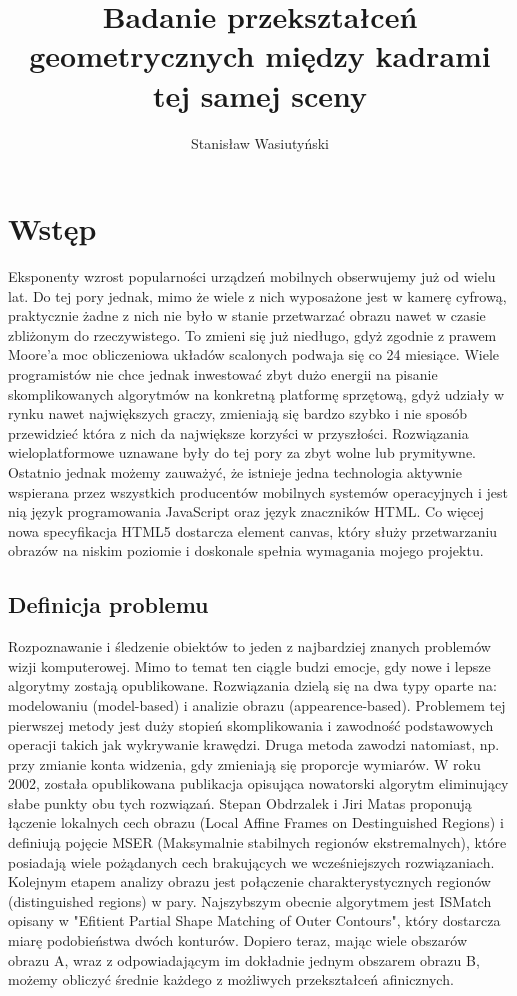 \documentclass[a4paper,12pt,polski]{report}
\title{Badanie przekształceń geometrycznych między kadrami tej samej sceny}
\author{Stanisław Wasiutyński}
\begin{document}
\maketitle

\tableofcontents

\newpage


\chapter{Wstęp}

Eksponenty wzrost popularności urządzeń mobilnych obserwujemy już od wielu lat.
Do tej pory jednak, mimo że wiele z nich wyposażone jest w kamerę cyfrową,
praktycznie żadne z nich nie było w stanie przetwarzać obrazu nawet w czasie
zbliżonym do rzeczywistego. To zmieni się już niedługo, gdyż zgodnie z prawem
Moore'a moc obliczeniowa układów scalonych podwaja się co 24 miesiące.  Wiele
programistów nie chce jednak inwestować zbyt dużo energii na pisanie
skomplikowanych algorytmów na konkretną platformę sprzętową, gdyż udziały w
rynku nawet największych graczy, zmieniają się bardzo szybko i nie sposób
przewidzieć która z nich da największe korzyści w przyszłości. Rozwiązania
wieloplatformowe uznawane były do tej pory za zbyt wolne lub prymitywne.
Ostatnio jednak możemy zauważyć, że istnieje jedna technologia aktywnie
wspierana przez wszystkich producentów mobilnych systemów operacyjnych i jest
nią język programowania JavaScript oraz język znaczników HTML. Co więcej nowa
specyfikacja HTML5 dostarcza element canvas, który służy przetwarzaniu obrazów
na niskim poziomie i doskonale spełnia wymagania mojego projektu.

\section{Definicja problemu}

Rozpoznawanie i śledzenie obiektów to jeden z najbardziej znanych problemów
wizji komputerowej. Mimo to temat ten ciągle budzi emocje, gdy nowe i lepsze
algorytmy zostają opublikowane. Rozwiązania dzielą się na dwa typy oparte na:
modelowaniu (model-based) i analizie obrazu (appearence-based). Problemem tej
pierwszej metody jest duży stopień skomplikowania i zawodność podstawowych
operacji takich jak wykrywanie krawędzi. Druga metoda zawodzi natomiast, np.
przy zmianie konta widzenia, gdy zmieniają się proporcje wymiarów.  W roku
2002, została opublikowana publikacja opisująca nowatorski algorytm eliminujący
słabe punkty obu tych rozwiązań. Stepan Obdrzalek i Jiri Matas proponują
łączenie lokalnych cech obrazu (Local Affine Frames on Destinguished Regions) i
definiują pojęcie MSER (Maksymalnie stabilnych regionów ekstremalnych), które
posiadają wiele pożądanych cech brakujących we wcześniejszych rozwiązaniach.
Kolejnym etapem analizy obrazu jest połączenie charakterystycznych regionów
(distinguished regions) w pary. Najszybszym obecnie algorytmem jest ISMatch
opisany w "Efitient Partial Shape Matching of Outer Contours", który dostarcza
miarę podobieństwa dwóch konturów. Dopiero teraz, mając wiele obszarów obrazu
A, wraz z odpowiadającym im dokładnie jednym obszarem obrazu B, możemy obliczyć
średnie każdego z możliwych przekształceń afinicznych.
\end{document}
